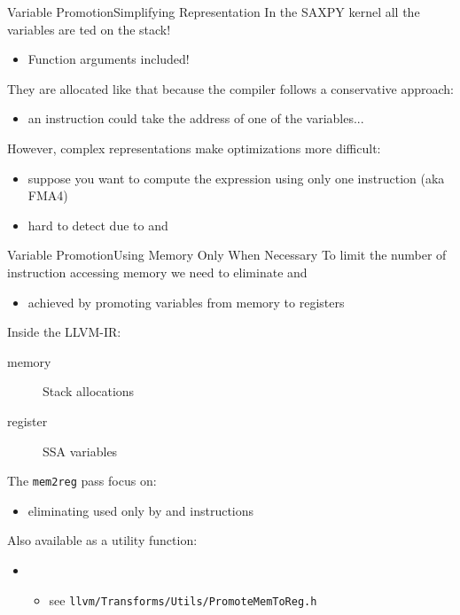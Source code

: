 \begin{frame}{Variable Promotion}{Simplifying Representation}
In the SAXPY kernel all the variables are ted on the stack!
\begin{itemize}
\item Function arguments included!
\end{itemize}

\vfill
They are allocated like that because the compiler follows a \alert{conservative} approach:
\begin{itemize}
\item an instruction could take the address of one of the variables...
\end{itemize}

\vfill
However, complex representations make optimizations more difficult:
\begin{itemize}
\item suppose you want to compute the  expression using only \alert{one}
      instruction (aka FMA4)
\item hard to detect due to  and 
\end{itemize}
\end{frame}


\begin{frame}{Variable Promotion}{Using Memory Only When Necessary}
To limit the number of instruction accessing memory we need to eliminate  and 
\begin{itemize}
\item achieved by \alert{promoting} variables from memory to registers
\end{itemize}

\vfill
Inside the LLVM-IR:
\begin{description}
\item[memory] Stack allocations \\
\item[register] SSA variables \\
\end{description}

\vfill
The \texttt{mem2reg} pass focus on:
\begin{itemize}
\item eliminating  used only by  and
       instructions
\end{itemize}

Also available as a utility function:
\begin{itemize}
\item {}\\
\begin{itemize}
\item see \texttt{llvm/Transforms/Utils/PromoteMemToReg.h}
\end{itemize}
\end{itemize}
\end{frame}


